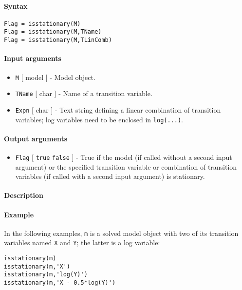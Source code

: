


	\paragraph{Syntax}

\begin{verbatim}
Flag = isstationary(M)
Flag = isstationary(M,TName)
Flag = isstationary(M,TLinComb)
\end{verbatim}

\paragraph{Input arguments}

\begin{itemize}
\item
  \texttt{M} {[} model {]} - Model object.
\item
  \texttt{TName} {[} char {]} - Name of a transition variable.
\item
  \texttt{Expn} {[} char {]} - Text string defining a linear combination
  of transition variables; log variables need to be enclosed in
  \texttt{log(...)}.
\end{itemize}

\paragraph{Output arguments}

\begin{itemize}
\itemsep1pt\parskip0pt
\item
  \texttt{Flag} {[} \texttt{true} \textbar{} \texttt{false} {]} - True
  if the model (if called without a second input argument) or the
  specified transition variable or combination of transition variables
  (if called with a second input argument) is stationary.
\end{itemize}

\paragraph{Description}

\paragraph{Example}

In the following examples, \texttt{m} is a solved model object with two
of its transition variables named \texttt{X} and \texttt{Y}; the latter
is a log variable:

\begin{verbatim}
isstationary(m)
isstationary(m,'X')
isstationary(m,'log(Y)')
isstationary(m,'X - 0.5*log(Y)')
\end{verbatim}


